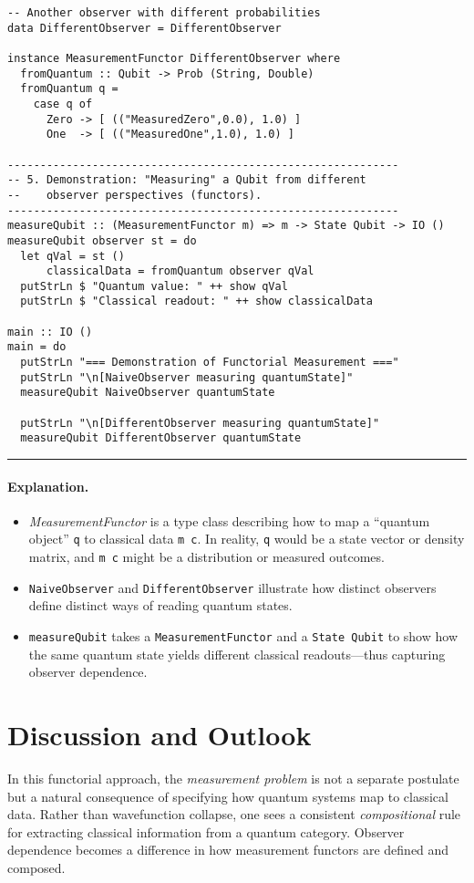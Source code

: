 \documentclass[12pt]{article}
\begin{document}
\begin{verbatim}
-- Another observer with different probabilities
data DifferentObserver = DifferentObserver

instance MeasurementFunctor DifferentObserver where
  fromQuantum :: Qubit -> Prob (String, Double)
  fromQuantum q =
    case q of
      Zero -> [ (("MeasuredZero",0.0), 1.0) ]
      One  -> [ (("MeasuredOne",1.0), 1.0) ]

------------------------------------------------------------
-- 5. Demonstration: "Measuring" a Qubit from different
--    observer perspectives (functors).
------------------------------------------------------------
measureQubit :: (MeasurementFunctor m) => m -> State Qubit -> IO ()
measureQubit observer st = do
  let qVal = st ()
      classicalData = fromQuantum observer qVal
  putStrLn $ "Quantum value: " ++ show qVal
  putStrLn $ "Classical readout: " ++ show classicalData

main :: IO ()
main = do
  putStrLn "=== Demonstration of Functorial Measurement ==="
  putStrLn "\n[NaiveObserver measuring quantumState]"
  measureQubit NaiveObserver quantumState

  putStrLn "\n[DifferentObserver measuring quantumState]"
  measureQubit DifferentObserver quantumState
\end{verbatim}
\noindent\rule{\textwidth}{0.4pt}

\paragraph{Explanation.}
\begin{itemize}
\item \emph{MeasurementFunctor} is a type class describing how to map a “quantum object” \texttt{q} to classical data \texttt{m c}. 
In reality, \texttt{q} would be a state vector or density matrix, and \texttt{m c} might be a distribution or measured outcomes.
\item \texttt{NaiveObserver} and \texttt{DifferentObserver} illustrate how distinct observers define distinct ways of reading quantum states.
\item \texttt{measureQubit} takes a \texttt{MeasurementFunctor} and a \texttt{State Qubit} to show how the same quantum state 
yields different classical readouts—thus capturing observer dependence.
\end{itemize}

\vspace{1em}

\section{Discussion and Outlook}
In this functorial approach, the \emph{measurement problem} is not a separate postulate but a natural consequence of specifying 
how quantum systems map to classical data. Rather than wavefunction collapse, one sees a consistent \emph{compositional} rule 
for extracting classical information from a quantum category. Observer dependence becomes a difference in how measurement 
functors are defined and composed. 
\end{document}
